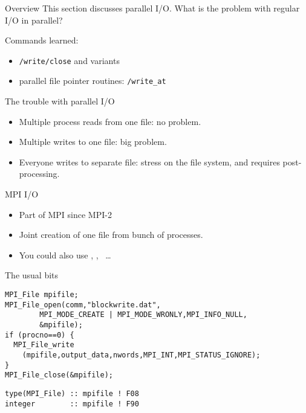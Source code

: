 
\begin{numberedframe}{Overview}
  This section discusses parallel I/O. What is the problem with
  regular I/O in parallel?

  Commands learned:
  \begin{itemize}
  \item {}\lstinline{/write/close} and variants
  \item parallel file pointer routines: \lstinline{/write_at}
  \end{itemize}
\end{numberedframe}

\begin{numberedframe}{The trouble with parallel I/O}
  \begin{itemize}
  \item Multiple process reads from one file: no problem.
  \item Multiple writes to one file: big problem.
  \item Everyone writes to separate file: stress on the file system,
    and requires post-processing.
  \end{itemize}
\end{numberedframe}

\begin{numberedframe}{MPI I/O}
  \begin{itemize}
  \item Part of MPI since MPI-2
  \item Joint creation of one file from bunch of processes.
  \item You could also use , , ~\ldots
  \end{itemize}
\end{numberedframe}

\begin{numberedframe}{The usual bits}
\small
\lstset{language=C}
\begin{lstlisting}
MPI_File mpifile;
MPI_File_open(comm,"blockwrite.dat",
        MPI_MODE_CREATE | MPI_MODE_WRONLY,MPI_INFO_NULL,
        &mpifile);
if (procno==0) {
  MPI_File_write
    (mpifile,output_data,nwords,MPI_INT,MPI_STATUS_IGNORE);
}
MPI_File_close(&mpifile);
\end{lstlisting}
\lstset{language=Fortran}
\begin{lstlisting}
type(MPI_File) :: mpifile ! F08
integer        :: mpifile ! F90
\end{lstlisting}
\end{numberedframe}

